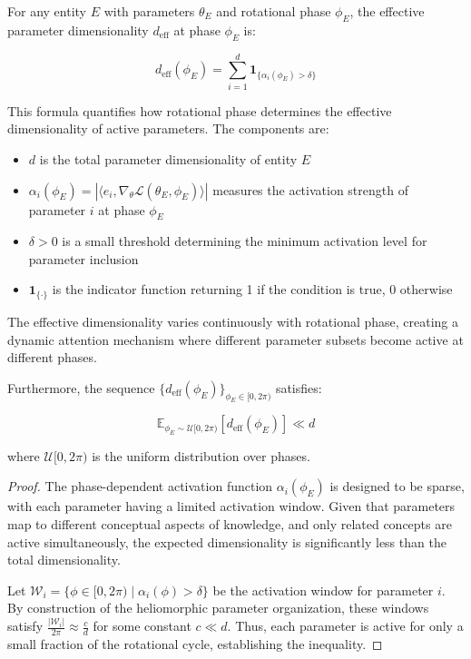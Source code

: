 \begin{theorem}
For any entity $E$ with parameters $\theta_E$ and rotational phase $\phi_E$, the effective parameter dimensionality $d_{\text{eff}}$ at phase $\phi_E$ is:

\begin{equation}
d_{\text{eff}}(\phi_E) = \sum_{i=1}^d \mathbf{1}_{\{\alpha_i(\phi_E) > \delta\}}
\end{equation}

This formula quantifies how rotational phase determines the effective dimensionality of active parameters. The components are:
\begin{itemize}
\item $d$ is the total parameter dimensionality of entity $E$
\item $\alpha_i(\phi_E) = |\langle e_i, \nabla_{\theta} \mathcal{L}(\theta_E, \phi_E) \rangle|$ measures the activation strength of parameter $i$ at phase $\phi_E$
\item $\delta > 0$ is a small threshold determining the minimum activation level for parameter inclusion
\item $\mathbf{1}_{\{\cdot\}}$ is the indicator function returning 1 if the condition is true, 0 otherwise
\end{itemize}

The effective dimensionality varies continuously with rotational phase, creating a dynamic attention mechanism where different parameter subsets become active at different phases.

Furthermore, the sequence $\{d_{\text{eff}}(\phi_E)\}_{\phi_E \in [0, 2\pi)}$ satisfies:

\begin{equation}
\mathbb{E}_{\phi_E \sim \mathcal{U}[0, 2\pi)}[d_{\text{eff}}(\phi_E)] \ll d
\end{equation}

where $\mathcal{U}[0, 2\pi)$ is the uniform distribution over phases.
\end{theorem}

\begin{proof}
The phase-dependent activation function $\alpha_i(\phi_E)$ is designed to be sparse, with each parameter having a limited activation window. Given that parameters map to different conceptual aspects of knowledge, and only related concepts are active simultaneously, the expected dimensionality is significantly less than the total dimensionality.

Let $\mathcal{W}_i = \{\phi \in [0, 2\pi) \mid \alpha_i(\phi) > \delta\}$ be the activation window for parameter $i$. By construction of the heliomorphic parameter organization, these windows satisfy $\frac{|\mathcal{W}_i|}{2\pi} \approx \frac{c}{d}$ for some constant $c \ll d$. Thus, each parameter is active for only a small fraction of the rotational cycle, establishing the inequality.
\end{proof}

